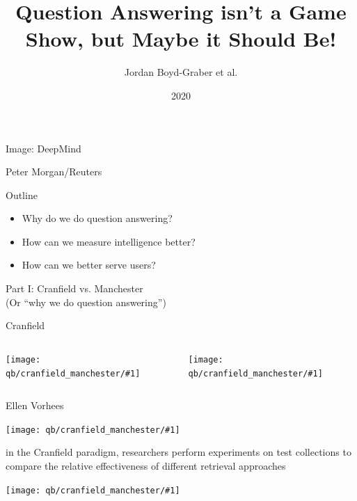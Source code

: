 \documentclass[xcolor=dvipsnames,xcolor=table]{beamer}
\title[HCQA]{Question Answering isn't a Game Show, but Maybe it Should Be!}
\author{Jordan Boyd-Graber et al.}
\date{2020}
\newcommand{\fsi}[2]{
\begin{frame}[plain]
\vspace*{-1pt}
\makebox[\linewidth]{\texttt{[image: \#1]}}
\begin{center}
#2
\end{center}
\end{frame}
}
\newcommand{\gfxcm}[2]{
\begin{center}
	\texttt{[image: qb/cranfield\_manchester/\#1]}
\end{center}
}
\begin{document}
\begin{frame}
  \titlepage{} 
\end{frame}

\fsi{qb/starcraft}{Image: DeepMind}
\fsi{qb/DeepBlue}{Peter Morgan/Reuters}

\begin{frame}{Outline}

  \begin{itemize}
  \item Why do we do question answering?
  \item How can we measure intelligence better?
    \item How can we better serve users?
  \end{itemize}

\end{frame}


\begin{frame}{}
  \huge Part I: Cranfield vs. Manchester \\
  (Or ``why we do question answering'')
\end{frame}


\begin{frame}{Cranfield}

  \begin{columns}
    \gfxcm{Cranfield_University_Arms_2007}{0.7}
    \gfxcm{Cranfield_University_from_the_air}{1.0}
  \end{columns}
  
\end{frame}

\begin{frame}{Ellen Vorhees}

  \gfxcm{ellen_voorhees}{.35}
  
  \begin{block}{}
in the Cranfield paradigm, researchers perform experiments on test
collections to compare the relative effectiveness of different
retrieval approaches
  \end{block}
  
\end{frame}

\begin{frame}{}

  \gfxcm{nq}{1.0}
  
\end{frame}
\end{document}
